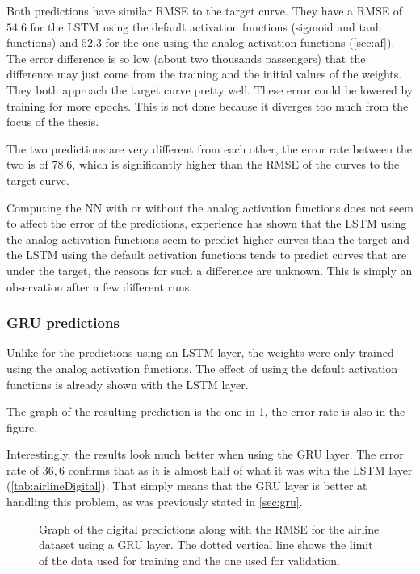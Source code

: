 Both predictions have similar \ac{RMSE} to the target curve. They have a \ac{RMSE} of $54.6$ for the \ac{LSTM} using the default activation functions (sigmoid and \ac{tanh} functions) and $52.3$ for the one using the analog activation functions (\cref{sec:af}). The error difference is so low (about two thousands passengers) that the difference may just come from the training and the initial values of the weights. They both approach the target curve pretty well. These error could be lowered by training for more epochs. This is not done because it diverges too much from the focus of the thesis.

The two predictions are very different from each other, the error rate between the two is of $78.6$, which is significantly higher than the \ac{RMSE} of the curves to the target curve.

Computing the \ac{NN} with or without the analog activation functions does not seem to affect the error of the predictions, experience has shown that the \ac{LSTM} using the analog activation functions seem to predict higher curves than the target and the \ac{LSTM} using the default activation functions tends to predict curves that are under the target, the reasons for such a difference are unknown. This is simply an observation after a few different runs.

\subsubsection{\acs{GRU} predictions}

Unlike for the predictions using an \ac{LSTM} layer, the weights were only trained using the analog activation functions. The effect of using the default activation functions is already shown with the \ac{LSTM} layer.

The graph of the resulting prediction is the one in \cref{graph:airlineDigitalGRU}, the error rate is also in the figure.

Interestingly, the results look much better when using the \ac{GRU} layer. The error rate of $36,6$ confirms that as it is almost half of what it was with the \ac{LSTM} layer (\cref{tab:airlineDigital}). That simply means that the \ac{GRU} layer is better at handling this problem, as was previously stated in \cref{sec:gru}.

\begin{figure}[H]
  \centering
  
  \caption{Graph of the digital predictions along with the \ac{RMSE} for the airline dataset using a \ac{GRU} layer. The dotted vertical line shows the limit of the data used for training and the one used for validation.}
  \label{graph:airlineDigitalGRU}
\end{figure}

